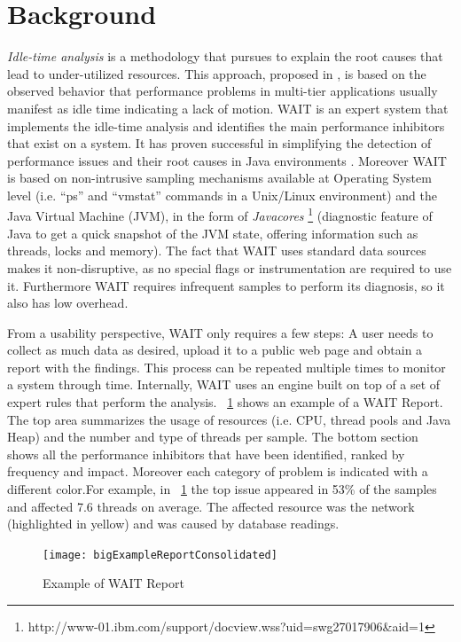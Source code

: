 \documentclass[runningheads,a4paper]{llncs}
\begin{document}
\section{Background}
\label{Background}
\vspace{-5pt}
\emph{Idle-time analysis} is a methodology that pursues to explain the root
causes that lead to under-utilized resources. This approach, proposed in
\cite{Altman2010}, is based on the observed behavior that performance problems in multi-tier
applications usually manifest as idle time indicating a lack of motion.
WAIT is an expert system that implements the idle-time analysis and identifies
the main performance inhibitors that exist on a system. It has proven
successful in simplifying the detection of performance issues and their root causes in Java
environments \cite{Altman2010,Wu1}.
Moreover WAIT is based on non-intrusive sampling mechanisms available at
Operating System level (i.e. ``ps'' and ``vmstat'' commands in a Unix/Linux
environment) and the Java Virtual Machine (JVM), in the form of \emph{Javacores}
\footnote{http://www-01.ibm.com/support/docview.wss?uid=swg27017906\&aid=1}
(diagnostic feature of Java to get a quick snapshot of the JVM state, offering
information such as threads, locks and memory). The fact that WAIT uses standard
data sources makes it non-disruptive, as no special flags or instrumentation are
required to use it. Furthermore WAIT requires infrequent samples to perform its
diagnosis, so it also has low overhead.

From a usability perspective, WAIT only requires a few steps: A user needs to
collect as much data as desired, upload it to a public web page and obtain a
report with the findings. This process can be repeated multiple times to monitor a
system through time. Internally, WAIT uses an engine built on top of a set of 
expert rules that perform the analysis. \figurename ~\ref{fig_WAITReport} shows an
example of a WAIT Report. The top area summarizes the usage of resources (i.e.
CPU, thread pools and Java Heap) and the number and type of threads per sample. 
The bottom section shows all the performance inhibitors that have been identified, ranked
by frequency and impact. Moreover each category of problem is indicated with a
different color.For example, in \figurename ~\ref{fig_WAITReport} the top issue
appeared in 53\% of the samples and affected 7.6 threads on average. The
affected resource was the network (highlighted in yellow) and was caused by
database readings.

\begin{figure}[!h]
\centering
\texttt{[image: bigExampleReportConsolidated]}
\caption{Example of WAIT Report}
\label{fig_WAITReport}
\end{figure}
\end{document}
